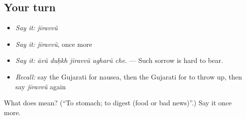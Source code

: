 \subsection*{Your turn}
\begin{itemize}
\raggedright
  \item \emph{Say it:} \emph{jīravvũ}
  \item \emph{Say it:} \emph{jīravvũ}, once more
  \item \emph{Say it:} \emph{āvũ duḥkh jīravvũ agharũ che.} — Such sorrow is hard to bear.
  \item \emph{Recall:} say the Gujarati for nausea, then the Gujarati for to throw up, then say \emph{jīravvũ} again
\end{itemize}

\begin{tcolorbox}[breakable,colback=teal!4,colframe=teal!35!black,title={Before you move on}]
What does  mean? (\textquotedblleft{}To stomach; to digest (food or bad news)\textquotedblright{}.) Say it once more.
\end{tcolorbox}
